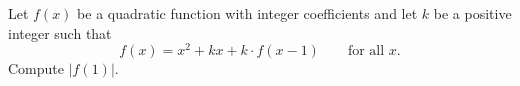 Let $f(x)$ be a quadratic function with integer coefficients and let $k$ be a positive integer such that
\[f(x)=x^2+kx+k\cdot f(x-1)\qquad\text{for all }x.\]
Compute $|f(1)|$.
